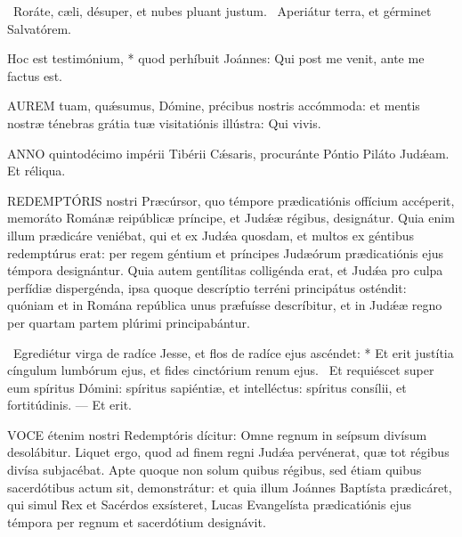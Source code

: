 
\V\ Roráte, cæli, désuper, et nubes pluant justum. \R\ Aperiátur terra, et gérminet Salvatórem.

 Hoc est testimónium, * quod perhíbuit Joánnes: Qui post me venit, ante me factus est.



\lettrine[lines=2]{A}{UREM} tuam, quǽsumus, Dómine, précibus nostris accómmoda: et mentis nostræ ténebras grátia tuæ visitatiónis illústra: Qui vivis.

\sectionornament





\lettrine[lines=2]{A}{NNO} quintodécimo impérii Tibérii Cǽsaris, procuránte Póntio Piláto Judǽam. Et réliqua.



\lettrine[lines=2]{R}{EDEMPTÓRIS} nostri Præcúrsor, quo témpore prædicatiónis offícium accéperit, memoráto Románæ reipúblicæ príncipe, et Judǽæ régibus, designátur. Quia enim illum prædicáre veniébat, qui et ex Judǽa quosdam, et multos ex géntibus redemptúrus erat: per regem géntium et príncipes Judæórum prædicatiónis ejus témpora designántur. Quia autem gentílitas colligénda erat, et Judǽa pro culpa perfídiæ dispergénda, ipsa quoque descríptio terréni principátus osténdit: quóniam et in Romána república unus præfuísse descríbitur, et in Judǽæ regno per quartam partem plúrimi principabántur.

\R\ Egrediétur virga de radíce Jesse, et flos de radíce ejus ascéndet: * Et erit justítia cíngulum lumbórum ejus, et fides cinctórium renum ejus. \V\ Et requiéscet super eum spíritus Dómini: spíritus sapiéntiæ, et intelléctus: spíritus consílii, et fortitúdinis. --- Et erit.


\lettrine[lines=2]{V}{OCE} étenim nostri Redemptóris dícitur: Omne regnum in seípsum divísum desolábitur. Liquet ergo, quod ad finem regni Judǽa pervénerat, quæ tot régibus divísa subjacébat. Apte quoque non solum quibus régibus, sed étiam quibus sacerdótibus actum sit, demonstrátur: et quia illum Joánnes Baptísta prædicáret, qui simul Rex et Sacérdos exsísteret, Lucas Evangelísta prædicatiónis ejus témpora per regnum et sacerdótium designávit.


